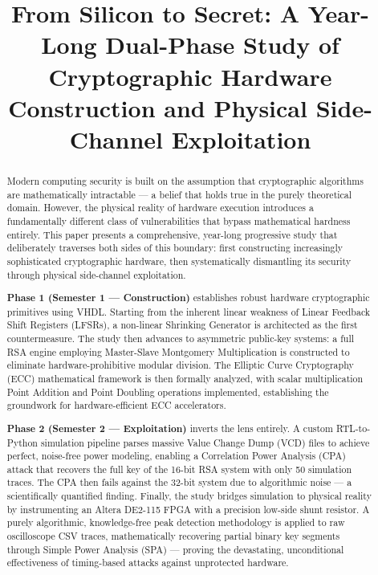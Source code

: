 \documentclass[conference, a4paper]{IEEEtran}
\begin{document}
\title{From Silicon to Secret: A Year-Long Dual-Phase Study of Cryptographic Hardware Construction and Physical Side-Channel Exploitation}

\author{
}

\maketitle

\begin{abstract}
Modern computing security is built on the assumption that cryptographic algorithms are mathematically intractable — a belief that holds true in the purely theoretical domain. However, the physical reality of hardware execution introduces a fundamentally different class of vulnerabilities that bypass mathematical hardness entirely. This paper presents a comprehensive, year-long progressive study that deliberately traverses both sides of this boundary: first constructing increasingly sophisticated cryptographic hardware, then systematically dismantling its security through physical side-channel exploitation.

\textbf{Phase 1 (Semester 1 — Construction)} establishes robust hardware cryptographic primitives using VHDL. Starting from the inherent linear weakness of Linear Feedback Shift Registers (LFSRs), a non-linear Shrinking Generator is architected as the first countermeasure. The study then advances to asymmetric public-key systems: a full RSA engine employing Master-Slave Montgomery Multiplication is constructed to eliminate hardware-prohibitive modular division. The Elliptic Curve Cryptography (ECC) mathematical framework is then formally analyzed, with scalar multiplication Point Addition and Point Doubling operations implemented, establishing the groundwork for hardware-efficient ECC accelerators.

\textbf{Phase 2 (Semester 2 — Exploitation)} inverts the lens entirely. A custom RTL-to-Python simulation pipeline parses massive Value Change Dump (VCD) files to achieve perfect, noise-free power modeling, enabling a Correlation Power Analysis (CPA) attack that recovers the full key of the 16-bit RSA system with only 50 simulation traces. The CPA then fails against the 32-bit system due to algorithmic noise — a scientifically quantified finding. Finally, the study bridges simulation to physical reality by instrumenting an Altera DE2-115 FPGA with a precision low-side shunt resistor. A purely algorithmic, knowledge-free peak detection methodology is applied to raw oscilloscope CSV traces, mathematically recovering partial binary key segments through Simple Power Analysis (SPA) — proving the devastating, unconditional effectiveness of timing-based attacks against unprotected hardware.
\end{abstract}
\end{document}
